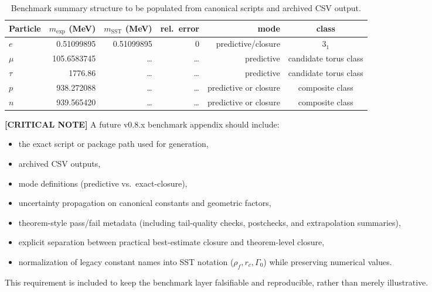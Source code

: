 \documentclass[11pt]{article}
\theoremstyle{definition}
\theoremstyle{plain}
\theoremstyle{remark}
\newcommand{\rhoF}{{\rho_{\!f}}}
\newcommand{\rc}{{r_c}}
\begin{document}
        \begin{table}[h]
        \centering
        \caption{Benchmark summary structure to be populated from canonical scripts and archived CSV output.}
        \label{tab:benchmark_summary_structure}
        \begin{tabular}{lrrrrc}
        \hline
        Particle & $m_{\mathrm{exp}}$ (MeV) & $m_{\mathrm{SST}}$ (MeV) & rel.\ error & mode & class \\
        \hline
        $e$   & 0.51099895 & 0.51099895 & 0 & predictive/closure & $3_1$ \\
        $\mu$ & 105.6583745 & \dots & \dots & predictive & candidate torus class \\
        $\tau$& 1776.86 & \dots & \dots & predictive & candidate torus class \\
        $p$   & 938.272088 & \dots & \dots & predictive or closure & composite class \\
        $n$   & 939.565420 & \dots & \dots & predictive or closure & composite class \\
        \hline
        \end{tabular}
        \end{table}

        \textbf{[CRITICAL NOTE]} A future v0.8.x benchmark appendix should include:
        \begin{itemize}
            \item the exact script or package path used for generation,
            \item archived CSV outputs,
            \item mode definitions (predictive vs.\ exact-closure),
            \item uncertainty propagation on canonical constants and geometric factors,
            \item theorem-style pass/fail metadata (including tail-quality checks, postchecks, and extrapolation summaries),
            \item explicit separation between practical best-estimate closure and theorem-level closure,
            \item normalization of legacy constant names into SST notation (\(\rhoF,\rc,\Gamma_0\)) while preserving numerical values.
        \end{itemize}

        This requirement is included to keep the benchmark layer falsifiable and reproducible, rather than merely illustrative.
\end{document}

